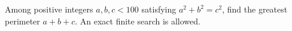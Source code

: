 Among positive integers $ a,b,c<100 $ satisfying $ a^2+b^2=c^2 $, find the greatest perimeter $ a+b+c $. An exact finite search is allowed.
